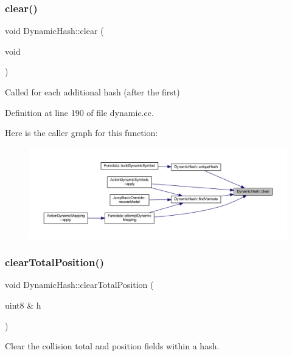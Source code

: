 \subsubsection{\texorpdfstring{clear()}{clear()}}
{\footnotesize\ttfamily void Dynamic\+Hash\+::clear (\begin{DoxyParamCaption}\item[{void}]{ }\end{DoxyParamCaption})}



Called for each additional hash (after the first) 



Definition at line 190 of file dynamic.\+cc.

Here is the caller graph for this function\+:
\nopagebreak
\begin{figure}[H]
\begin{center}
\leavevmode
\includegraphics[width=350pt]{class_dynamic_hash_aa260964020db06dfcee8565544aa3b96_icgraph}
\end{center}
\end{figure}
\mbox{\label{class_dynamic_hash_a4eb9f9e5767cc8c956a0111d4a5ca89b}} 
\subsubsection{\texorpdfstring{clearTotalPosition()}{clearTotalPosition()}}
{\footnotesize\ttfamily void Dynamic\+Hash\+::clear\+Total\+Position (\begin{DoxyParamCaption}\item[{uint8 \&}]{h }\end{DoxyParamCaption})\hspace{0.3cm}{\ttfamily [static]}}



Clear the collision total and position fields within a hash. 

